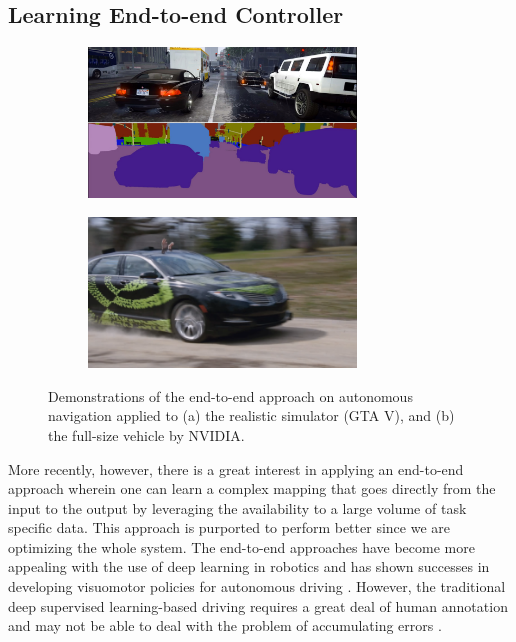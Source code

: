 \documentclass[../thesis.tex]{subfiles}
\begin{document}
\subsection{Learning End-to-end Controller}

\begin{figure}[b]
    \centering
    \begin{subfigure}[b]{0.45\linewidth}
        \includegraphics[height=4cm]{./Introduction/gta.jpg}
    \end{subfigure}
    \begin{subfigure}[b]{0.45\linewidth}
        \includegraphics[height=4cm]{./Introduction/nvidia.png}
    \end{subfigure}
    \caption{Demonstrations of the end-to-end approach on autonomous navigation applied to (a) the realistic simulator (GTA V), and (b) the full-size vehicle by NVIDIA\cite{nvidiacar}.}
    \label{fig:end-to-end}
\end{figure}


More recently, however, there is a great interest in applying an end-to-end approach wherein one can learn a complex mapping that goes directly from the input to the output by leveraging the availability to a large volume of task specific data. 
This approach is purported to perform better since we are optimizing the whole system. 
The end-to-end approaches have become more appealing with the use of deep learning in robotics and has shown successes in developing visuomotor policies for autonomous driving \cite{deepdriving,nvidiacar,endtoendcars}. 
However, the traditional deep supervised learning-based driving requires a great deal of human annotation and may not be able to deal with the problem of accumulating errors \cite{ross2011reduction}. 
\end{document}
